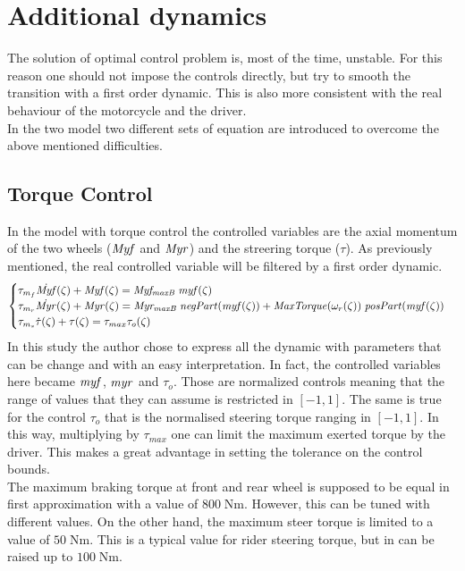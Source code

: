 \section{Additional dynamics}
\label{sec:AddDyn}
%
The solution of optimal control problem is, most of the time, unstable. For this reason one should not impose the controls directly, but try to smooth the transition with a first order dynamic. This is also more consistent with the real behaviour of the motorcycle and the driver.\\
In the two model two different sets of equation are introduced to overcome the above mentioned difficulties.
%
\subsection{Torque Control}
%
In the model with torque control the controlled variables are the axial momentum of the two wheels ($\it Myf$ and $\it Myr$) and the streering torque ($\tau$). As previously mentioned, the real controlled variable will be filtered by a first order dynamic. 
%
\begin{equation}
    \begin{cases}
        \tau_{m_f} \dot{\it Myf}(\zeta) + {\it Myf}(\zeta) = {\it Myf_{maxB}} \; {\it myf}(\zeta)\\
        \tau_{m_r} \dot{\it Myr}(\zeta) + {\it Myr}(\zeta) = {\it Myr_{maxB}} \; {\it negPart}({\it myf}(\zeta)) + {\it MaxTorque}(\omega_r(\zeta)) \; {\it posPart}({\it myf}(\zeta)) \\
        \tau_{m_s} \dot{\tau}(\zeta) + \tau(\zeta) = \tau_{max} \tau_o(\zeta)
    \end{cases}
    \label{eq:AddDynaT}
\end{equation}
%
In this study the author chose to express all the dynamic with parameters that can be change and with an easy interpretation. In fact, the controlled variables here became ${\it myf}$, ${\it myr}$ and $\tau_o$. Those are normalized controls meaning that the range of values that they can assume is restricted in $[-1,1]$. The same is true for the control $\tau_o$ that is the normalised steering torque ranging in $[-1,1]$. In this way, multiplying by $\tau_{max}$ one can limit the maximum exerted torque by the driver. This makes a great advantage in setting the tolerance on the control bounds.\\
The maximum braking torque at front and rear wheel is supposed to be equal in first approximation with a value of $800 \; \si{\newton\metre}$. However, this can be tuned with different values. On the other hand, the maximum steer torque is limited to a value of $50 \; \si{\newton\metre}$. This is a typical value for rider steering torque, but in can be raised up to $100 \; \si{\newton\metre}$.\\
